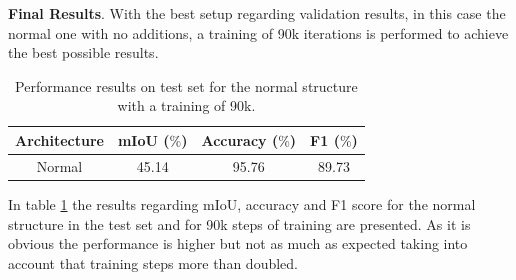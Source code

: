 \documentclass[12pt,a4paper]{article}
\begin{document}
\textbf{Final Results}. With the best setup regarding validation results, in this case the normal one with no additions, a training of 90k iterations is performed to achieve the best possible results.\newline

\begin{table}[h!]
  \begin{center}
    
    \begin{tabular}{|c|c|c|c|} %
      \textbf{Architecture} & \textbf{mIoU ($\%$)} & \textbf{Accuracy ($\%$)} & \textbf{F1 ($\%$)} \\
      \hline
      Normal & 45.14 & 95.76 & 89.73\\
    \end{tabular}
    \caption{Performance results on test set for the normal structure with a training of 90k.}
    \label{icnet:table3}
  \end{center}
\end{table}

In table \ref{icnet:table3} the results regarding mIoU, accuracy and F1 score for the normal structure in the test set and for 90k steps of training are presented. As it is obvious the performance is higher but not as much as expected taking into account that training steps more than doubled.\newline
\end{document}
